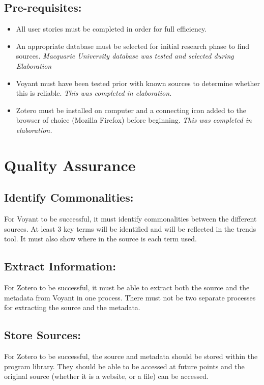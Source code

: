 \documentclass{article}
\begin{document}
\subsection{Pre-requisites:}
\begin{itemize}
    \item All user stories must be completed in order for full efficiency. 
    \item An appropriate database must be selected for initial research phase to find sources. \textit{Macquarie University database was tested and selected during Elaboration}
    \item Voyant must have been tested prior with known sources to determine whether this is reliable. \textit{This was completed in elaboration.}
    \item Zotero must be installed on computer and a connecting icon added to the browser of choice (Mozilla Firefox) before beginning. \textit{This was completed in elaboration.}
    \end{itemize}
    
\section{Quality Assurance}
\subsection{Identify Commonalities:}
For Voyant to be successful, it must identify commonalities between the different sources. At least 3 key terms will be identified and will be reflected in the trends tool. It must also show where in the source is each term used.

\subsection{Extract Information:}
For Zotero to be successful, it must be able to extract both the source and the metadata from Voyant in one process. There must not be two separate processes for extracting the source and the metadata. 

\subsection{Store Sources:}
For Zotero to be successful, the source and metadata should be stored within the program library. They should be able to be accessed at future points and the original source (whether it is a website, or a file) can be accessed.
\end{document}
